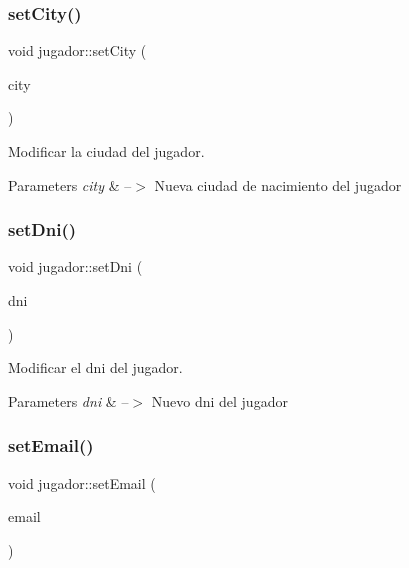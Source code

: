 \subsubsection{\texorpdfstring{set\+City()}{setCity()}}
{\footnotesize\ttfamily void jugador\+::set\+City (\begin{DoxyParamCaption}\item[{Q\+String}]{city }\end{DoxyParamCaption})}



Modificar la ciudad del jugador. 


\begin{DoxyParams}{Parameters}
{\em city} & --$>$ Nueva ciudad de nacimiento del jugador \\
\hline
\end{DoxyParams}
\mbox{\label{classjugador_a442a923a8704d783a9b0b7ce917a7e39}} 
\subsubsection{\texorpdfstring{set\+Dni()}{setDni()}}
{\footnotesize\ttfamily void jugador\+::set\+Dni (\begin{DoxyParamCaption}\item[{Q\+String}]{dni }\end{DoxyParamCaption})}



Modificar el dni del jugador. 


\begin{DoxyParams}{Parameters}
{\em dni} & --$>$ Nuevo dni del jugador \\
\hline
\end{DoxyParams}
\mbox{\label{classjugador_a75f1d73c24c859503450958bbf1d48ea}} 
\subsubsection{\texorpdfstring{set\+Email()}{setEmail()}}
{\footnotesize\ttfamily void jugador\+::set\+Email (\begin{DoxyParamCaption}\item[{Q\+String}]{email }\end{DoxyParamCaption})}



